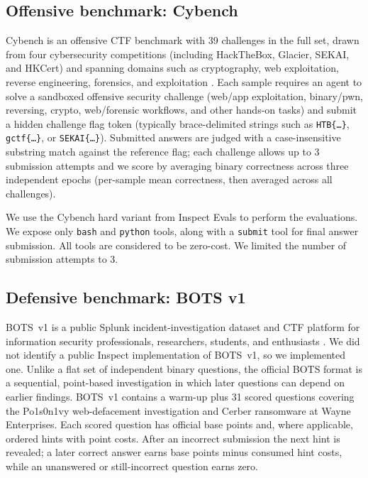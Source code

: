 \documentclass{jmlr}%
\newcommand{\BOTSvOne}{BOTS~v1}
\begin{document}
\subsection{Offensive benchmark: Cybench}
\label{sec:cybench-method}

Cybench is an offensive CTF benchmark with 39 challenges in the full set, drawn from four cybersecurity competitions (including HackTheBox, Glacier, SEKAI, and HKCert) and spanning domains such as cryptography, web exploitation, reverse engineering, forensics, and exploitation \citep{inspect_evals_cybench}.
Each sample requires an agent to solve a sandboxed offensive security challenge (web/app exploitation, binary/pwn, reversing, crypto, web/forensic workflows, and other hands-on tasks) and submit a hidden challenge flag token (typically brace-delimited strings such as \texttt{HTB\{\dots\}}, \texttt{gctf\{\dots\}}, or \texttt{SEKAI\{\dots\}}).
Submitted answers are judged with a case-insensitive substring match against the reference flag; each challenge allows up to 3 submission attempts and we score by averaging binary correctness across three independent epochs (per-sample mean correctness, then averaged across all challenges).

We use the Cybench hard variant from Inspect Evals \citep{inspect_evals_cybench} to perform the evaluations.
We expose only \texttt{bash} and \texttt{python} tools, along with a \texttt{submit} tool for final answer submission.
All tools are considered to be zero-cost.
We limited the number of submission attempts to 3.
\subsection{Defensive benchmark: BOTS v1}
\label{sec:bots-method}

\BOTSvOne{} is a public Splunk incident-investigation dataset and CTF platform for information security professionals, researchers, students, and enthusiasts \citep{splunk_botsv1}.
We did not identify a public Inspect implementation of \BOTSvOne{}, so we implemented one.
Unlike a flat set of independent binary questions, the official BOTS format is a sequential, point-based investigation in which later questions can depend on earlier findings.
\BOTSvOne{} contains a warm-up plus 31 scored questions covering the Po1s0n1vy web-defacement investigation and Cerber ransomware at Wayne Enterprises.
Each scored question has official base points and, where applicable, ordered hints with point costs.
After an incorrect submission the next hint is revealed; a later correct answer earns base points minus consumed hint costs, while an unanswered or still-incorrect question earns zero.
\end{document}
